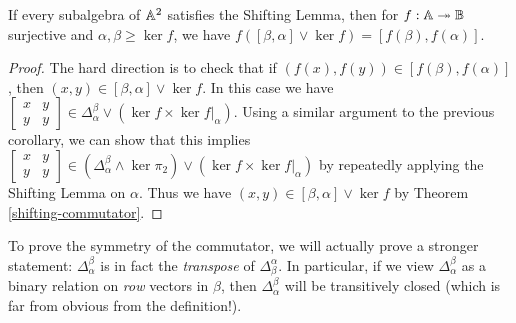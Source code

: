 \documentclass[letterpaper,11pt]{article}
\begin{document}
\begin{cor} If every subalgebra of $\mathbb{A}^2$ satisfies the Shifting Lemma, then for $f : \mathbb{A} \twoheadrightarrow \mathbb{B}$ surjective and $\alpha, \beta \ge \ker f$, we have $f([\beta,\alpha]\vee \ker f) = [f(\beta),f(\alpha)]$.
\end{cor}
\begin{proof} The hard direction is to check that if $(f(x), f(y)) \in [f(\beta),f(\alpha)]$, then $(x,y) \in [\beta,\alpha]\vee \ker f$. In this case we have $\begin{bmatrix} x & y\\ y & y\end{bmatrix} \in \Delta_\alpha^\beta \vee (\ker f\times \ker f|_\alpha)$. Using a similar argument to the previous corollary, we can show that this implies $\begin{bmatrix} x & y\\ y & y\end{bmatrix} \in (\Delta_\alpha^\beta \wedge \ker \pi_2) \vee (\ker f\times \ker f|_\alpha)$ by repeatedly applying the Shifting Lemma on $\alpha$. Thus we have $(x,y) \in [\beta,\alpha] \vee \ker f$ by Theorem \ref{shifting-commutator}.
\end{proof}

To prove the symmetry of the commutator, we will actually prove a stronger statement: $\Delta_\alpha^\beta$ is in fact the \emph{transpose} of $\Delta_\beta^\alpha$. In particular, if we view $\Delta_\alpha^\beta$ as a binary relation on \emph{row} vectors in $\beta$, then $\Delta_\alpha^\beta$ will be transitively closed (which is far from obvious from the definition!).
\end{document}
